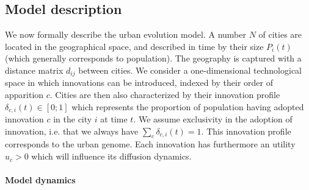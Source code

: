 \documentclass[letterpaper]{article}
\begin{document}
\subsection{Model description}


 
We now formally describe the urban evolution model. A number $N$ of cities are located in the geographical space, and described in time by their size $P_i (t)$ (which generally corresponds to population). The geography is captured with a distance matrix $d_{ij}$ between cities. We consider a one-dimensional technological space in which innovations can be introduced, indexed by their order of apparition $c$. Cities are then also characterized by their innovation profile $\delta_{c,i} (t) \in \left[0;1\right]$ which represents the proportion of population having adopted innovation $c$ in the city $i$ at time $t$. We assume exclusivity in the adoption of innovation, i.e. that we always have $\sum_c \delta_{c,i} (t) = 1$. This innovation profile corresponds to the urban genome. Each innovation has furthermore an utility $u_c >0$ which will influence its diffusion dynamics.


\paragraph{Model dynamics}

\end{document}
